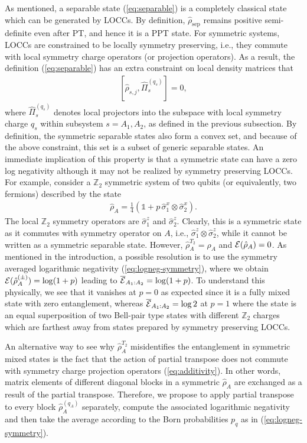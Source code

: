 \documentclass[aps,pra,reprint,superscriptaddress,twocolumn,notitlepage]{revtex4-1}
\newcommand{\rTa}{{\hat\rho^{T_2}_A} }
\numberwithin{equation}{section}
\begin{document}
As mentioned, a separable state (\ref{eq:separable}) is a completely classical state which can be generated by LOCCs.
By definition, $\hat \rho_{\text{sep}}$ remains positive semi-definite even after PT, and hence it is a PPT state.
For symmetric systems, LOCCs are constrained to be locally symmetry preserving, i.e., they commute with local symmetry charge operators (or projection operators). As a result, the definition (\ref{eq:separable}) has an extra constraint on local density matrices that
\begin{align}\label{eq:symmetry_condition_symm_LOCC}
[\hat \rho_{s,j}, \hat \Pi_s^{(q_s)}]=0,
\end{align}
 where 
 $\hat \Pi_s^{(q_s)}$ denotes local projectors into the subspace with local symmetry charge $q_s$ within subsystem $s=A_1,A_2$, as defined in the previous subsection. By definition, the symmetric separable states also form a convex set, and because of the above constraint, this set is a subset of generic separable states. An immediate implication of this property is that a symmetric state can have a zero log negativity although it may not be realized by symmetry preserving LOCCs. For example, consider a $\mathbb{Z}_2$ symmetric system of two qubits (or equivalently, two fermions) described by the state
 \begin{align}
     \hat \rho_A = \frac{1}{4} (\mathbb{1} + p\,\hat\sigma^x_1 \otimes \hat\sigma^x_2).
 \end{align}
The local $\mathbb{Z}_2$ symmetry operators are $\hat\sigma^z_1$ and $\hat\sigma^z_2$. Clearly, this is a symmetric state as it commutes with symmetry operator on $A$, i.e., $\hat\sigma^z_1\otimes \hat\sigma^z_2$, while it cannot be written as a symmetric separable state. However, $\rTa = \rho_A$ and ${\cal E}(\hat\rho_A) =0$. As mentioned in the introduction, a possible resolution is to use the symmetry averaged logarithmic negativity (\ref{eq:logneg-symmetry}), where we obtain ${\cal E}(\hat\rho_A^{(\pm)})=
\log(1+p)$ leading to $\overline{\cal E}_{A_1:A_2}=\log (1+p)$. To understand this physically, we see that it vanishes at $p=0$ as expected since it is a fully mixed state with zero entanglement, whereas $\overline{\cal E}_{A_1:A_2}=\log 2$ at $p=1$ where the state is an equal superposition of two Bell-pair type states with different $\mathbb{Z}_2$ charges which are farthest away from states prepared by symmetry preserving LOCCs.

An alternative way to see why $\rTa$ misidentifies the entanglement in symmetric mixed states is the fact that the action of partial transpose does not commute with symmetry charge projection operators (\ref{eq:additivity}). In other words, matrix elements of different diagonal blocks in a symmetric $\hat\rho_A$ are exchanged as a result of the partial transpose. 
Therefore, we propose to apply partial transpose to every block $\hat\rho_A^{(q_A)}$ separately, compute the associated logarithmic negativity and then take the average according to the Born probabilities $p_q$ as in (\ref{eq:logneg-symmetry}). 
\end{document}

